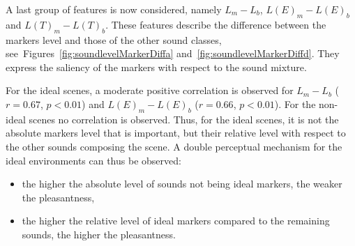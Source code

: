 \documentclass[12pt]{elsarticle}
\newcommand{\cf}{cf.}
\begin{document}

A last group of features is now considered, namely $L_m-L_b$, $L(E)_m-L(E)_b$ and $L(T)_m-L(T)_b$.  These features describe the difference between the markers level and those of the other sound classes, see~Figures~\ref{fig:soundlevelMarkerDiffa} and~\ref{fig:soundlevelMarkerDiffd}. They express the saliency of the markers with respect to the sound mixture.


For the ideal scenes, a moderate positive correlation is observed for $L_m-L_b$ ($r=0.67$, $p<0.01$) and $L(E)_m-L(E)_b$ ($r=0.66$, $p<0.01$). For the non-ideal scenes no correlation is observed. Thus, for the ideal scenes, it is not the absolute markers level that is important, but their relative level with respect to the other sounds composing the scene. A double perceptual mechanism for the ideal environments can thus be observed:


\begin{itemize}
\item the higher the absolute level of sounds not being ideal markers, the weaker the pleasantness,
\item the higher the relative level of ideal markers compared to the remaining sounds, the higher the pleasantness.
\end{itemize}
\end{document}
